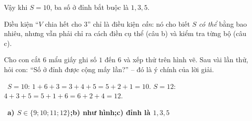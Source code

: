 \documentclass[11pt]{article}
\providecommand{\AnsWord}{Đáp số}
\newcommand{\ans}[1]{\par\smallskip{\bfseries\color{tmGreen!88!black}\AnsWord:}\ {\bfseries\color{AnsRed}#1}\par}
\newcommand{\verify}[1]{\par\smallskip\noindent{\bfseries\color{tmGreen!80!black}\faCheckCircle\ \CheckWord}\ #1\par}
\def\AnsWord{Đáp số}
\def\CheckWord{Thử lại:}
\begin{document}
{Vậy khi $S = 10$, ba số ở đỉnh bắt buộc là $1, 3, 5$.
\begin{warnbox}Điều kiện ``$V$ chia hết cho $3$'' chỉ là điều kiện \emph{cần}: nó cho biết $S$ \emph{có thể} bằng bao nhiêu, nhưng
vẫn phải chỉ ra cách điền cụ thể (câu b) và kiểm tra từng bộ (câu c).\end{warnbox}
\begin{parentbox}Cho con cắt $6$ mẩu giấy ghi số $1$ đến $6$ và xếp thử trên hình vẽ. Sau vài lần thử, hỏi con: ``Số ở đỉnh được
cộng mấy lần?'' -- đó là ý chính của lời giải.\end{parentbox}
\verify{$S = 10$: $1 + 6 + 3 = 3 + 4 + 5 = 5 + 2 + 1 = 10$. $S = 12$: $4 + 3 + 5 = 5 + 1 + 6 = 6 + 2 + 4 = 12$.}
\ans{a) $S \in \{9; 10; 11; 12\}$;\quad b) như hình;\quad c) đỉnh là $1, 3, 5$}
}

\providecommand{\lgxcdShape}[3]{\ifcase#1\or
  \draw[Ink,fill=Slate!35,line width=0.6pt] (#2,#3) circle (0.19);\or
  \draw[Ink,fill=tmBlue!35,line width=0.6pt] ($(#2,#3)+(-0.18,-0.18)$) rectangle ($(#2,#3)+(0.18,0.18)$);\or
  \draw[Ink,fill=tmOrange!45,line width=0.6pt] ($(#2,#3)+(-0.2,0.17)$)--($(#2,#3)+(0.2,0.17)$)--($(#2,#3)+(0,-0.19)$)--cycle;\or
  \draw[Ink,fill=tmGreen!45,line width=0.6pt,shift={(#2,#3)}] (90:0.24) \foreach \lgxcdk in {1,...,9}{ -- ({90+36*\lgxcdk}:{ifthenelse(mod(\lgxcdk,2)==1,0.1,0.24)})} -- cycle;\fi}
\providecommand{\lgxcdI}[1]{\tikz[baseline=-0.7ex]{\lgxcdShape{#1}{0}{0}}}
\providecommand{\lgxcdRow}[2]{\foreach \lgxcdt [count=\lgxcdi] in {#2}{%
  \pgfmathsetmacro\lgxcdxx{(\lgxcdi-(#1+1)/2)*0.48}\lgxcdShape{\lgxcdt}{\lgxcdxx}{0.21}}}
\providecommand{\lgxcdBal}[5]{\begin{scope}[yshift=#1cm]
  \draw[Ink,line width=1pt] (-2.7,0)--(-0.3,0) (0.3,0)--(2.7,0);
  \draw[Ink,line width=0.9pt] (-1.5,0)--(-1.5,-0.55)--(1.5,-0.55)--(1.5,0);
  \draw[Ink,fill=Slate!25,line width=0.9pt] (-0.22,-0.95)--(0,-0.55)--(0.22,-0.95)--cycle;
  \draw[Ink,line width=1pt] (-0.45,-0.95)--(0.45,-0.95);
  \begin{scope}[xshift=-1.5cm]\lgxcdRow{#2}{#3}\end{scope}
  \begin{scope}[xshift=1.5cm]\lgxcdRow{#4}{#5}\end{scope}\end{scope}}
\end{document}
